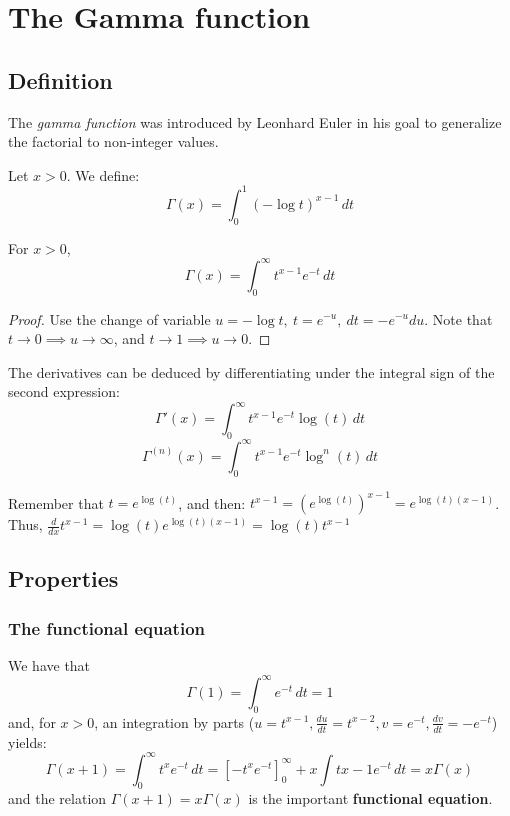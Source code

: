 \section{The Gamma function}

\subsection{Definition}

The \textit{gamma function} was introduced by Leonhard Euler in his goal to generalize the factorial to non-integer values.

\begin{definition}[Euler, 1970]
    Let $x > 0$. We define:
    \[
        \Gamma(x) = \int_0^1 (-\log t)^{x - 1} \, dt
    \]   
\end{definition}

\begin{theorem}
    For $x > 0$,
    \[
        \Gamma(x) = \int_0^\infty t^{x - 1} e^{-t} \, dt
    \]
\end{theorem}
\begin{proof}
    Use the change of variable $u = -\log t, \ t = e^{-u}, \ dt = -e^{-u} du$. Note that $t \rightarrow 0 \implies u \rightarrow \infty$, and $t \rightarrow 1 \implies u \rightarrow 0$.
\end{proof}

The derivatives can be deduced by differentiating under the integral sign of the second expression:
\[
    \Gamma'(x) = \int_0^\infty t^{x - 1} e^{-t} \log(t) \, dt
\]
\[
    \Gamma^{(n)}(x) = \int_0^\infty t^{x - 1} e^{-t} \log^n(t) \, dt
\]

\begin{remark}
    Remember that $t = e^{\log(t)}$, and then: $t^{x - 1} = (e^{\log(t)})^{x - 1} = e^{\log(t) (x - 1)}$. Thus, $\frac{d}{dx} t^{x - 1} = \log(t) e^{\log(t) (x - 1)} = \log(t) t^{x - 1} $
\end{remark}

\subsection{Properties}

\subsubsection{The functional equation}

We have that
\[
    \Gamma(1) = \int_0^\infty e^{-t} \, dt = 1
\]
and, for $x > 0$, an integration by parts ($u = t^{x - 1}, \frac{du}{dt} = t^{x - 2}, v = e^{-t}, \frac{dv}{dt} = -e^{-t}$) yields:
\[
    \Gamma(x + 1) = \int_0^\infty t^x e^{-t} \, dt = [-t^x e^{-t}]_0^\infty + x \int t{x - 1} e^{-t} \, dt = x\Gamma(x)
\]
and the relation $\Gamma(x + 1) = x \Gamma(x)$ is the important \textbf{functional equation}.


